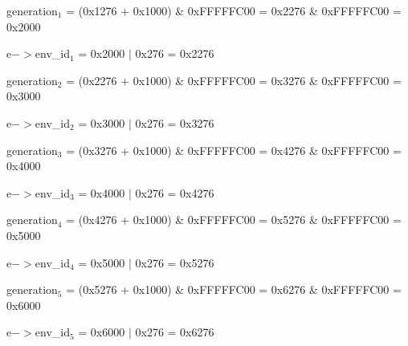 \documentclass[titlepage,a4paper,12pt]{article}
\begin{document}
\begin{enumerate}
generation$_{1}$ = (0x1276 + 0x1000) \& 0xFFFFFC00 = 0x2276 \& 0xFFFFFC00 = 0x2000

e$->$env\_id$_{1}$ = 0x2000 $\mid$ 0x276 = 0x2276

generation$_{2}$ = (0x2276 + 0x1000) \& 0xFFFFFC00 = 0x3276 \& 0xFFFFFC00 = 0x3000

e$->$env\_id$_{2}$ = 0x3000 $\mid$ 0x276 = 0x3276

generation$_{3}$ = (0x3276 + 0x1000) \& 0xFFFFFC00 = 0x4276 \& 0xFFFFFC00 = 0x4000

e$->$env\_id$_{3}$ = 0x4000 $\mid$ 0x276 = 0x4276

generation$_{4}$ = (0x4276 + 0x1000) \& 0xFFFFFC00 = 0x5276 \& 0xFFFFFC00 = 0x5000

e$->$env\_id$_{4}$ = 0x5000 $\mid$ 0x276 = 0x5276

generation$_{5}$ = (0x5276 + 0x1000) \& 0xFFFFFC00 = 0x6276 \& 0xFFFFFC00 = 0x6000

e$->$env\_id$_{5}$ = 0x6000 $\mid$ 0x276 = 0x6276


\end{enumerate}
\end{document}
